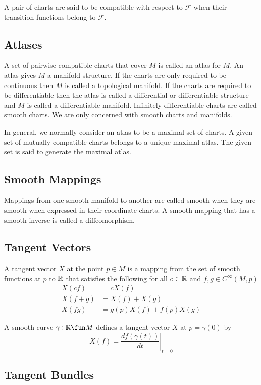\documentclass[11pt, oneside]{article}
\begin{document}
A pair of charts are said to be compatible with respect to $\mathcal{F}$ when their transition functions belong to $\mathcal{F}$.

\subsection{Atlases}
A set of pairwise compatible charts that cover $M$ is called an atlas for $M$.
An atlas gives $M$ a manifold structure.
If the charts are only required to be continuous then $M$ is called a topological manifold.
If the charts are required to be differentiable then the atlas is called a differential or differentiable structure and $M$ is called
a differentiable manifold.
Infinitely differentiable charts are called smooth charts.
We are only concerned with smooth charts and manifolds.

In general, we normally consider an atlas to be a maximal set of charts.
A given set of mutually compatible charts belongs to a unique maximal atlas.
The given set is said to generate the maximal atlas.

\subsection{Smooth Mappings}
Mappings from one smooth manifold to another are called smooth when they are smooth when expressed in their coordinate charts.
A smooth mapping that has a smooth inverse is called a diffeomorphism.

\subsection{Tangent Vectors}
A tangent vector $X$ at the point $p \in M$ is a mapping from the set of smooth functions at $p$ to $\mathbb{R}$ that satisfies the following 
for all $c \in \mathbb{R}$ and $f,g \in C^{\infty}(M,p)$
\begin{align}
	X(cf) &= cX(f) \\
	X(f + g) &= X(f) + X(g) \\
	X(fg) &= g(p)X(f) + f(p)X(g)
\end{align}

A smooth curve $\gamma: \R \fun M$ defines a tangent vector $X$ at $p=\gamma(0)$ by
\begin{equation}
	X(f) = \left.\frac{df(\gamma(t))}{dt}\right|_{t=0}
\end{equation}

\subsection{Tangent Bundles}
\end{document}

